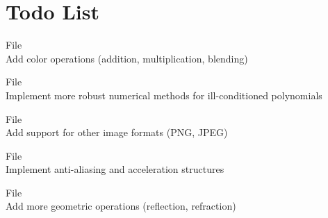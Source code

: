 \chapter{Todo List}
\hypertarget{todo}{}\label{todo}

\begin{DoxyRefList}
\item[File \doxylink{Color_8hpp}{Color.hpp} ]\hfill \\
\label{todo__todo000002}%
%
Add color operations (addition, multiplication, blending)  
\item[File \doxylink{PolynomialSolver_8hpp}{Polynomial\+Solver.hpp} ]\hfill \\
\label{todo__todo000003}%
%
Implement more robust numerical methods for ill-\/conditioned polynomials  
\item[File \doxylink{PpmWriter_8hpp}{Ppm\+Writer.hpp} ]\hfill \\
\label{todo__todo000004}%
%
Add support for other image formats (PNG, JPEG)  
\item[File \doxylink{Renderer_8hpp}{Renderer.hpp} ]\hfill \\
\label{todo__todo000001}%
%
Implement anti-\/aliasing and acceleration structures  
\item[File \doxylink{Vector3_8hpp}{Vector3.hpp} ]\hfill \\
\label{todo__todo000005}%
%
Add more geometric operations (reflection, refraction) 
\end{DoxyRefList}
